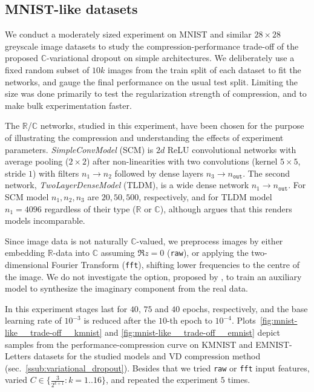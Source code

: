 \documentclass[a4paper,10pt]{article}
\newcommand{\real}{\mathbb{R}}
\newcommand{\cplx}{\mathbb{C}}
\begin{document}


\subsection{MNIST-like datasets} %
\label{sub:mnist_like_datasets}

We conduct a moderately sized experiment on MNIST and similar $28\times 28$ greyscale image
datasets to study the compression-performance trade-off of the proposed $\cplx$-variational
dropout on simple architectures.
We deliberately use a {fixed} random subset of $10k$ images from the train split of each
dataset to fit the networks, and gauge the final performance on the usual test split.
Limiting the size was done primarily to test the regularization strength of compression,
and to make bulk experimentation faster.

The $\real$/$\cplx$ networks, studied in this experiment, have been chosen for the purpose 
of illustrating the compression and understanding the effects of experiment parameters.
\textit{SimpleConvModel} (SCM) is $2d$ ReLU convolutional networks with average pooling
($2\times 2$) after non-linearities with two convolutions (kernel $5\times 5$, stride $1$)
with filters $n_1 \to n_2$ followed by dense layers $n_3 \to n_\mathtt{out}$. The second
network, \textit{TwoLayerDenseModel} (TLDM), is a wide dense network $n_1 \to n_\mathtt{out}$.
For SCM model $n_1, n_2, n_3$ are $20, 50, 500$, respectively, and for TLDM model $
  n_1 = 4096
$ regardless of their type ($\real$ or $\cplx$), although \citet{monning_evaluation_2018}
argues that this renders models incomparable.

Since image data is not naturally $\cplx$-valued, we preprocess images by either embedding
$\real$-data into $\cplx$ assuming $\Re z = 0$ (\texttt{raw}), or applying the two-dimensional
Fourier Transform (\texttt{fft}), shifting lower frequencies to the centre of the image. We
do not investigate the option, proposed by \citet{trabelsi_deep_2017}, to train an auxiliary
model to synthesize the imaginary component from the real data.

In this experiment stages last for $40$, $75$ and $40$ epochs, respectively, and the base
learning rate of ${10}^{-3}$ is reduced after the $10$-th epoch to ${10}^{-4}$.
%
Plots~\ref{fig:mnist-like__trade-off__kmnist} and \ref{fig:mnist-like__trade-off__emnist}
depict samples from the performance-compression curve on KMNIST and EMNIST-Letters datasets
for the studied models and VD compression method (sec.~\ref{ssub:variational_dropout}).
Besides that we tried \texttt{raw} or \texttt{fft} input features, varied $
  C \in \{\tfrac3{2^{k+1}}\colon k=1..16\}
$, and repeated the experiment $5$ times.
\end{document}
